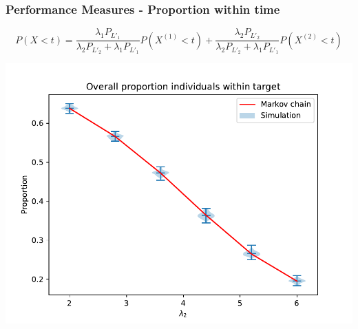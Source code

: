 \begin{frame}
    \frametitle{Performance Measures - Proportion within time}
    \centering
    
    \small
    \begin{equation}
        P(X < t) = \frac{\lambda_1 P_{L'_1}}{\lambda_2 P_{L'_2}+\lambda_1 P_{L'_1}} 
        P(X^{(1)} < t) + \frac{\lambda_2 P_{L'_2}}{\lambda_2 P_{L'_2} + 
        \lambda_1 P_{L'_1}}P(X^{(2)} < t) 
    \end{equation}
    \normalsize

    \includegraphics[scale=0.5]{Bin/proportion_overall_comparison.pdf}

\end{frame}